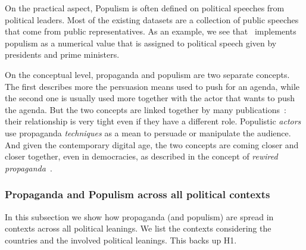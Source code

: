 On the practical aspect, Populism is often defined on political speeches from political leaders. Most of the existing datasets are a collection of public speeches that come from public representatives.
As an example, we see that~\citet{hawkins2019global} implements populism as a numerical value that is assigned to political speech given by presidents and prime ministers.


On the conceptual level, propaganda and populism are two separate concepts. The first describes more the persuasion means used to push for an agenda, while the second one is usually used more together with the actor that wants to push the agenda. 
%
%
%
%
%
But the two concepts are linked together by many publications~\citet{tumber2021routledge,pasquino2008populism}: their relationship is very tight even if they have a different role. Populistic \emph{actors} use propaganda \emph{techniques} as a mean to persuade or manipulate the audience.
And given the contemporary digital age, the two concepts are coming closer and closer together, even in democracies, as described in the concept of \textit{rewired propaganda}~\citep{oates2021rewired}. %




\subsubsection{\statusgreen Propaganda and Populism across all political contexts}
\label{ssec:ps_prop_leaning_imbalanced_populism_across}

In this subsection we show how propaganda (and populism) are spread in contexts across all political leanings. We list the contexts considering the countries and the involved political leanings.
This backs up H1.

